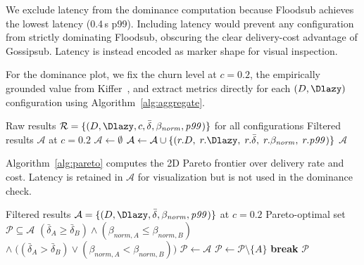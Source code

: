 \documentclass{article}
\begin{document}
We exclude latency from the dominance computation because Floodsub achieves
the lowest latency (0.4\,s p99). Including latency would prevent any
configuration from strictly dominating Floodsub, obscuring the clear
delivery-cost advantage of Gossipsub. Latency is instead encoded as marker
shape for visual inspection.

For the dominance plot, we fix the churn level at $c = 0.2$, the
empirically grounded value from Kiffer~\etal, and extract metrics
directly for each $(D, \Dlazy)$ configuration using
Algorithm~\ref{alg:aggregate}.

\begin{algorithm}[H]
\caption{Filter Results at Fixed Churn Level ($c = 0.2$)}
\label{alg:aggregate}
\begin{algorithmic}[1]
\Require Raw results $\mathcal{R} = \{(D, \Dlazy, c, \bar{\delta}, \beta_{\mathit{norm}}, \mathit{p99})\}$ for all configurations
\Ensure Filtered results $\mathcal{A}$ at $c = 0.2$
\State $\mathcal{A} \gets \emptyset$
        \State $\mathcal{A} \gets \mathcal{A} \cup \{(r.D,\; r.\Dlazy,\; r.\bar{\delta},\; r.\beta_{\mathit{norm}},\; r.\mathit{p99})\}$
    \EndIf
\EndFor
\State \Return $\mathcal{A}$
\end{algorithmic}
\end{algorithm}

Algorithm~\ref{alg:pareto} computes the 2D Pareto frontier over delivery rate and cost.
Latency is retained in $\mathcal{A}$ for visualization but
is not used in the dominance check.

\begin{algorithm}[H]
\caption{Compute 2D Pareto Frontier}
\label{alg:pareto}
\begin{algorithmic}[1]
\Require Filtered results $\mathcal{A} = \{(D, \Dlazy, \bar{\delta}, \beta_{\mathit{norm}}, \mathit{p99})\}$ at $c=0.2$
\Ensure Pareto-optimal set $\mathcal{P} \subseteq \mathcal{A}$
 
    \State \Return $(\bar{\delta}_A \geq \bar{\delta}_B) \land ({\beta_{\mathit{norm},A}} \leq {\beta_{\mathit{norm},B}})$
    \Statex \hspace{\algorithmicindent} $\land \; \bigl((\bar{\delta}_A > \bar{\delta}_B) \lor ({\beta_{\mathit{norm},A}} < {\beta_{\mathit{norm},B}})\bigr)$
\EndFunction
\State $\mathcal{P} \gets \mathcal{A}$
            \State $\mathcal{P} \gets \mathcal{P} \setminus \{A\}$
            \State \textbf{break}
        \EndIf
    \EndFor
\EndFor
\State \Return $\mathcal{P}$
\end{algorithmic}
\end{algorithm}
\end{document}
